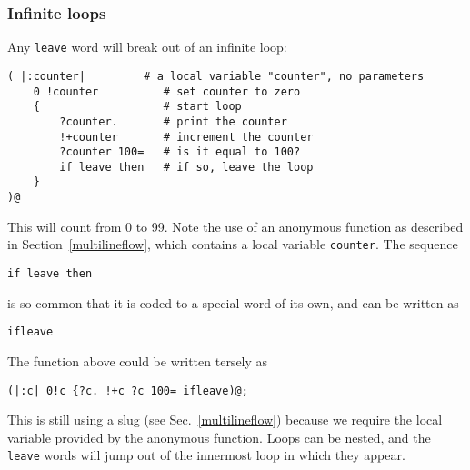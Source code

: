 \subsubsection{Infinite loops}
Any \texttt{leave} word will break out of an infinite loop:
\begin{lstlisting}
( |:counter|         # a local variable "counter", no parameters
    0 !counter          # set counter to zero
    {                   # start loop
        ?counter.       # print the counter
        !+counter       # increment the counter
        ?counter 100=   # is it equal to 100?
        if leave then   # if so, leave the loop
    }
)@
\end{lstlisting}
This will count from 0 to 99. Note the use of an anonymous function
as described in Section~\ref{multilineflow}, which contains a local
variable \texttt{counter}.
The sequence
\begin{lstlisting}
if leave then
\end{lstlisting}
is so common that it is coded to a special word of its own, and can be written
as 
\begin{lstlisting}
ifleave
\end{lstlisting}
The function above could be written tersely as
\begin{lstlisting}
(|:c| 0!c {?c. !+c ?c 100= ifleave)@;
\end{lstlisting}
This is still using a slug (see Sec.~\ref{multilineflow})
because we require the local variable
provided by the anonymous function.
Loops can be nested, and the \texttt{leave} words will jump out of the
innermost loop in which they appear.

